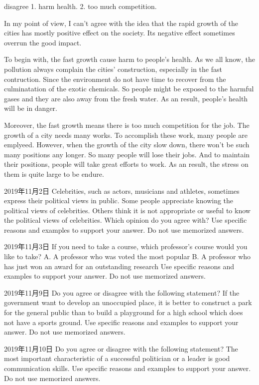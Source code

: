 disagree
1. harm health.
2. too much competition.

In my point of view, I can't agree with the idea that the rapid growth of the cities has mostly positive effect on the society. Its negative effect sometimes overrun the good impact.

To begin with, the fast growth cause harm to people's health. As we all know, the pollution always complain the cities' construction, especially in the fast contruction. Since the environment do not have time to recover from the culminatation of the exotic chemicals. So people might be exposed to the harmful gases and they are also away from the fresh water. As an result, people's health will be in danger.

Moreover, the fast growth means there is too much competition for the job. The growth of a city needs many works. To accomplish these work, many people are emplyeed. However, when the growth of the city slow down, there won't be such many positions any longer. So many people will lose their jobs. And to maintain their positions, people will take great efforts to work. As an result, the stress on them is quite large to be endure.

2019年11月2日
Celebrities, such as actors, musicians and athletes, sometimes express their political views in public. Some people appreciate knowing the political views of celebrities. Others think it is not appropriate or useful to know the political views of celebrities. Which opinion do you agree with?
Use specific reasons and examples to support your answer. Do not use memorized answers.

2019年11月3日
If you need to take a course, which professor's course would you like to take?
A. A professor who was voted the most popular
B. A professor who has just won an award for an outstanding research
Use specific reasons and examples to support your answer. Do not use memorized answers.

2019年11月9日
Do you agree or disagree with the following statement?
If the government want to develop an unoccupied place, it is better to construct a park for the general public than to build a playground for a high school which does not have a sports ground.
Use specific reasons and examples to support your answer. Do not use memorized answers.

2019年11月10日
Do you agree or disagree with the following statement?
The most important characteristic of a successful politician or a leader is good communication skills.
Use specific reasons and examples to support your answer. Do not use memorized answers.

